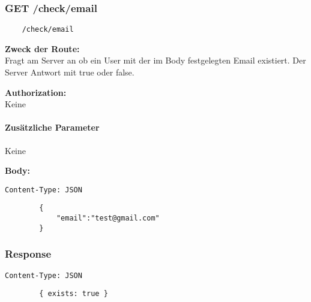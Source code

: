 \label{/other}

\newpage
\subsubsection{GET /check/email}

\begin{lstlisting}
    /check/email
\end{lstlisting}

\textbf{Zweck der Route:} \\
Fragt am Server an ob ein User mit der im Body
festgelegten Email existiert. Der Server Antwort mit
true oder false.

\textbf{Authorization:} \\
Keine

\paragraph{Zusätzliche Parameter}
Keine

\textbf{Body:}
\begin{code}[htp]
    \lstinline{Content-Type: JSON}
    \begin{lstlisting}
        {
            "email":"test@gmail.com"
        }
    \end{lstlisting}
    \caption{Body der Check-Email-Route}
\end{code}

\subsubsection{Response}

\begin{code}
    \lstinline{Content-Type: JSON}
    \begin{lstlisting}
        { exists: true }
    \end{lstlisting}
    \caption{Response der Check-Email-Route}
\end{code}

\pagebreak
